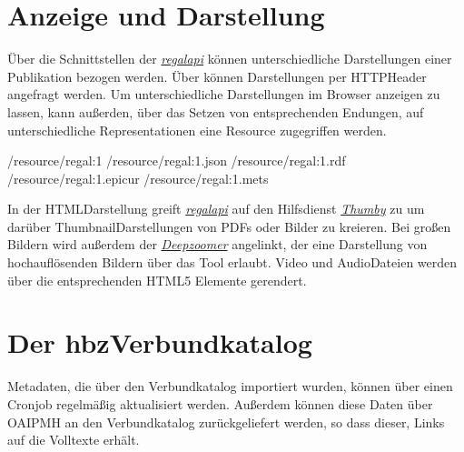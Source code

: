\documentclass[letterpaper,10pt,english]{sphinxmanual}
\begin{document}
\section{Anzeige und Darstellung}
\label{\detokenize{toscience:anzeige-und-darstellung}}\label{\detokenize{toscience:id7}}
\sphinxAtStartPar
Über die Schnittstellen der {\hyperref[\detokenize{toscience:_regal_api_2}]{\emph{regal\sphinxhyphen{}api}}} können
unterschiedliche Darstellungen einer Publikation bezogen werden. Über
können Darstellungen per HTTP\sphinxhyphen{}Header angefragt werden. Um
unterschiedliche Darstellungen im Browser anzeigen zu lassen, kann
außerden, über das Setzen von entsprechenden Endungen, auf
unterschiedliche Representationen eine Resource zugegriffen werden.

\sphinxAtStartPar
{}

\sphinxAtStartPar
/resource/regal:1 /resource/regal:1.json /resource/regal:1.rdf
/resource/regal:1.epicur /resource/regal:1.mets

\sphinxAtStartPar
In der HTML\sphinxhyphen{}Darstellung greift {\hyperref[\detokenize{toscience:_regal_api_2}]{\emph{regal\sphinxhyphen{}api}}} auf den
Hilfsdienst {\hyperref[\detokenize{toscience:_thumby}]{\emph{Thumby}}} zu um darüber Thumbnail\sphinxhyphen{}Darstellungen
von PDFs oder Bilder zu kreieren. Bei großen Bildern wird außerdem der
{\hyperref[\detokenize{toscience:_deepzoomer}]{\emph{Deepzoomer}}} angelinkt, der eine Darstellung von
hochauflösenden Bildern über das Tool
 erlaubt. Video\sphinxhyphen{} und
Audio\sphinxhyphen{}Dateien werden über die entsprechenden HTML5 Elemente gerendert.


\section{Der hbz\sphinxhyphen{}Verbundkatalog}
\label{\detokenize{toscience:der-hbz-verbundkatalog}}\label{\detokenize{toscience:id8}}
\sphinxAtStartPar
Metadaten, die über den Verbundkatalog importiert wurden, können über
einen Cronjob regelmäßig aktualisiert werden. Außerdem können diese
Daten über OAI\sphinxhyphen{}PMH an den Verbundkatalog zurückgeliefert werden, so dass
dieser, Links auf die Volltexte erhält.
\end{document}
